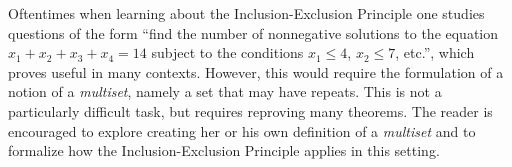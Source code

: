 \begin{remark} Oftentimes when learning about the Inclusion-Exclusion Principle one studies questions of the form ``find the number of nonnegative solutions to the equation $x_1 + x_2 + x_3 + x_4 = 14$ subject to the conditions $x_1 \leq 4$, $x_2 \leq 7$, etc.'', which proves useful in many contexts.  However, this would require the formulation of a notion of a \textit{multiset}, namely a set that may have repeats.  This is not a particularly difficult task, but requires reproving many theorems.  The reader is encouraged to explore creating her or his own definition of a \textit{multiset} and to formalize how the Inclusion-Exclusion Principle applies in this setting.
\end{remark}
